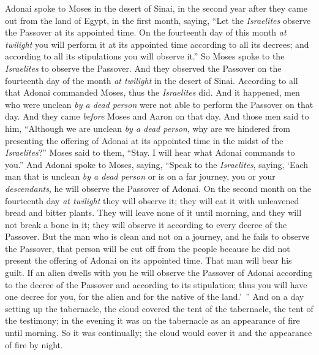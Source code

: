 \begin{biblechapter} %
 Adonai spoke to Moses in the desert of Sinai, in the second year after they came out from the land of Egypt, in the first month, saying,
\verse “Let the \textit{Israelites} observe the Passover at its appointed time.
\verse On the fourteenth day of this month \textit{at twilight} you will perform it at its appointed time according to all its decrees; and according to all its stipulations you will observe it.”
\verse So Moses spoke to the \textit{Israelites} to observe the Passover.
\verse And they observed the Passover on the fourteenth day of the month \textit{at twilight} in the desert of Sinai. According to all that Adonai commanded Moses, thus the \textit{Israelites} did.
\verse And it happened, men who were unclean \textit{by a dead person} were not able to perform the Passover on that day. And they came \textit{before} Moses and Aaron on that day.
\verse And those men said to him, “Although we are unclean \textit{by a dead person}, why are we hindered from presenting the offering of Adonai at its appointed time in the midst of the \textit{Israelites}?”
\verse Moses said to them, “Stay. I will hear what Adonai commands to you.”
\verse And Adonai spoke to Moses, saying,
\verse “Speak to the \textit{Israelites}, saying, ‘Each man that is unclean \textit{by a dead person} or is on a far journey, you or your \textit{descendants}, he will observe the Passover of Adonai.
\verse On the second month on the fourteenth day \textit{at twilight} they will observe it; they will eat it with unleavened bread and bitter plants.
\verse They will leave none of it until morning, and they will not break a bone in it; they will observe it according to every decree of the Passover.
\verse But the man who is clean and not on a journey, and he fails to observe the Passover, that person will be cut off from the people because he did not present the offering of Adonai on its appointed time. That man will bear his guilt.
\verse If an alien dwells with you he will observe the Passover of Adonai according to the decree of the Passover and according to its stipulation; thus you will have one decree for you, for the alien and for the native of the land.’ ”
 And on a day setting up the tabernacle, the cloud covered the tent of the tabernacle, the tent of the testimony; in the evening it was on the tabernacle as an appearance of fire until morning.
\verse So it was continually; the cloud would cover it and the appearance of fire by night.

\end{biblechapter}
